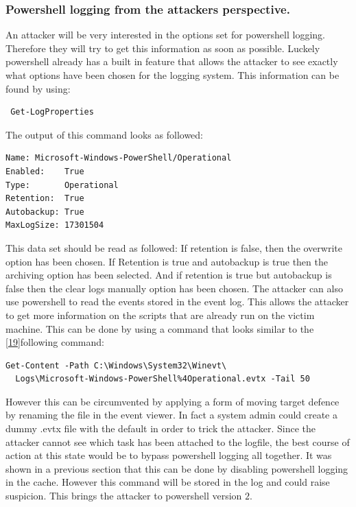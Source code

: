 \documentclass{article}%
\begin{document}
\subsubsection{Powershell logging from the attackers perspective.}
An attacker will be very interested in the options set for powershell logging. Therefore they will try to get this information as soon as possible. Luckely powershell already has a built in feature that allows the attacker to see exactly what options have been chosen for the logging system. This information can be found by using:
\begin{verbatim}
 Get-LogProperties
\end{verbatim}
The output of this command looks as followed:
\begin{verbatim}
Name: Microsoft-Windows-PowerShell/Operational
Enabled:    True
Type:       Operational
Retention:  True
Autobackup: True
MaxLogSize: 17301504
\end{verbatim}
This data set should be read as followed:\newline\newline
If retention is false, then the overwrite option has been chosen. If Retention is true and autobackup is true then the archiving option has been selected. And if retention is true but autobackup is false then the clear logs manually option has been chosen. The attacker can also use powershell to read the events stored in the event log. This allows the attacker to get more information on the scripts that are already run on the victim machine. This can be done by using a command that looks similar to the [\hyperlink{19}{19}]following command:
\begin{verbatim}
Get-Content -Path C:\Windows\System32\Winevt\
  Logs\Microsoft-Windows-PowerShell%4Operational.evtx -Tail 50
\end{verbatim}
However this can be circumvented by applying a form of moving target defence by renaming the file in the event viewer. In fact a system admin could create a dummy .evtx file with the default in order to trick the attacker. Since the attacker cannot see which task has been attached to the logfile, the best course of action at this state would be to bypass powershell logging all together. It was shown in a previous section that this can be done by disabling powershell logging in the cache. However this command will be stored in the log and could raise suspicion. This brings the attacker to powershell version $2$.
\end{document}
